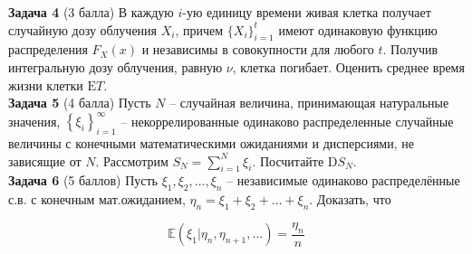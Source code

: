 \documentclass{article}
\begin{document}
\textbf{Задача 4} (3 балла)
В каждую $i$-ую единицу времени живая клетка получает случайную дозу облучения $X_i$, причем $\{X_i\}_{i=1}^{t}$ имеют одинаковую функцию распределения $F_X(x)$ и независимы в совокупности для любого $t$. Получив интегральную дозу облучения, равную $\nu$, клетка погибает. Оценить среднее время жизни клетки $\mathrm{E} T$.
\\

\textbf{Задача 5} (4 балла)
Пусть $N$ -- случайная величина, принимающая натуральные значения, $\left\{ \xi_i 
\right\}_{i=1}^\infty$ -- некоррелированные одинаково распределенные случайные 
величины с конечными математическими ожиданиями и дисперсиями, не 
зависящие от $N$.
Рассмотрим $S_N = \sum\limits_{i=1}^N \xi_i$. Посчитайте $\mathrm{D} S_N$.
\\

\textbf{Задача 6} (5 баллов)
Пусть $\xi_1, \xi_2, \dots, \xi_n$ -- независимые одинаково распределённые с.в. с конечным мат.ожиданием, $\eta_n = \xi_1 + \xi_2 + \dots + \xi_n$. Доказать, что

$$\mathbb{E}(\xi_1 \vert \eta_n, \eta_{n+1}, \dots) = \frac{\eta_n}{n}$$
\end{document}
